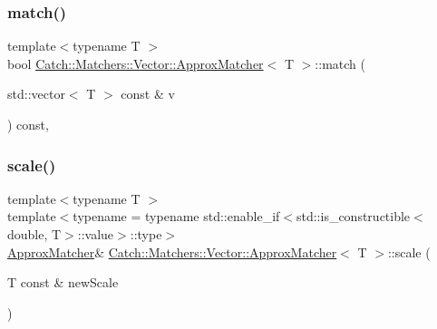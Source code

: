 \mbox{\label{struct_catch_1_1_matchers_1_1_vector_1_1_approx_matcher_a9cbd62093c4c123f1984726e1a14b270}} 
\subsubsection{\texorpdfstring{match()}{match()}}
{\footnotesize\ttfamily template$<$typename T $>$ \\
bool \mbox{\hyperlink{struct_catch_1_1_matchers_1_1_vector_1_1_approx_matcher}{Catch\+::\+Matchers\+::\+Vector\+::\+Approx\+Matcher}}$<$ T $>$\+::match (\begin{DoxyParamCaption}\item[{std\+::vector$<$ T $>$ const \&}]{v }\end{DoxyParamCaption}) const\hspace{0.3cm}{\ttfamily [inline]}, {\ttfamily [override]}}

\mbox{\label{struct_catch_1_1_matchers_1_1_vector_1_1_approx_matcher_a8658dc0564e0f80f101e4574830a3b18}} 
\subsubsection{\texorpdfstring{scale()}{scale()}}
{\footnotesize\ttfamily template$<$typename T $>$ \\
template$<$typename  = typename std\+::enable\+\_\+if$<$std\+::is\+\_\+constructible$<$double, T$>$\+::value$>$\+::type$>$ \\
\mbox{\hyperlink{struct_catch_1_1_matchers_1_1_vector_1_1_approx_matcher}{Approx\+Matcher}}\& \mbox{\hyperlink{struct_catch_1_1_matchers_1_1_vector_1_1_approx_matcher}{Catch\+::\+Matchers\+::\+Vector\+::\+Approx\+Matcher}}$<$ T $>$\+::scale (\begin{DoxyParamCaption}\item[{T const \&}]{new\+Scale }\end{DoxyParamCaption})\hspace{0.3cm}{\ttfamily [inline]}}



